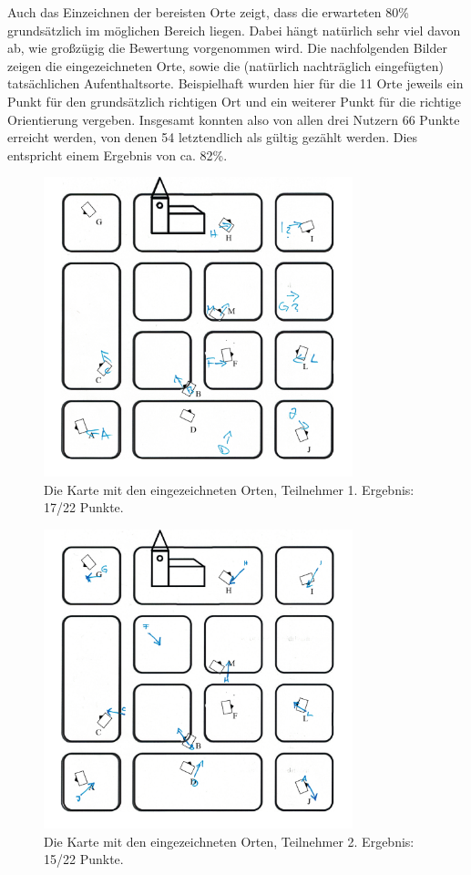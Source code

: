 \newpage
Auch das Einzeichnen der bereisten Orte zeigt, dass die erwarteten 80\% grundsätzlich im möglichen Bereich liegen. Dabei hängt natürlich sehr viel davon ab, wie großzügig die Bewertung vorgenommen wird. Die nachfolgenden Bilder zeigen die eingezeichneten Orte, sowie die (natürlich nachträglich eingefügten) tatsächlichen Aufenthaltsorte. Beispielhaft wurden hier für die 11 Orte jeweils ein Punkt für den grundsätzlich richtigen Ort und ein weiterer Punkt für die richtige Orientierung vergeben. Insgesamt konnten also von allen drei Nutzern 66 Punkte erreicht werden, von denen 54 letztendlich als gültig gezählt werden. Dies entspricht einem Ergebnis von ca. 82\%.


\begin{figure}[]
  \centering
  \includegraphics[width=0.8\textwidth]{images/map_full_with_curch_c.png}
  \caption{Die Karte mit den eingezeichneten Orten, Teilnehmer 1. Ergebnis: 17/22 Punkte.}
  \label{fig:todo}
\end{figure}


\begin{figure}[]
  \centering
  \includegraphics[width=0.8\textwidth]{images/map_full_with_curch_b.png}
  \caption{Die Karte mit den eingezeichneten Orten, Teilnehmer 2. Ergebnis: 15/22 Punkte.}
  \label{fig:todo}
\end{figure}


